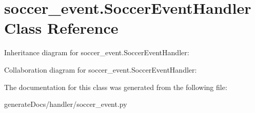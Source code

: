 \hypertarget{classsoccer__event_1_1_soccer_event_handler}{}\section{soccer\+\_\+event.\+Soccer\+Event\+Handler Class Reference}
\label{classsoccer__event_1_1_soccer_event_handler}


Inheritance diagram for soccer\+\_\+event.\+Soccer\+Event\+Handler\+:


Collaboration diagram for soccer\+\_\+event.\+Soccer\+Event\+Handler\+:


The documentation for this class was generated from the following file\+:\begin{DoxyCompactItemize}
\item 
generate\+Docs/handler/soccer\+\_\+event.\+py\end{DoxyCompactItemize}
